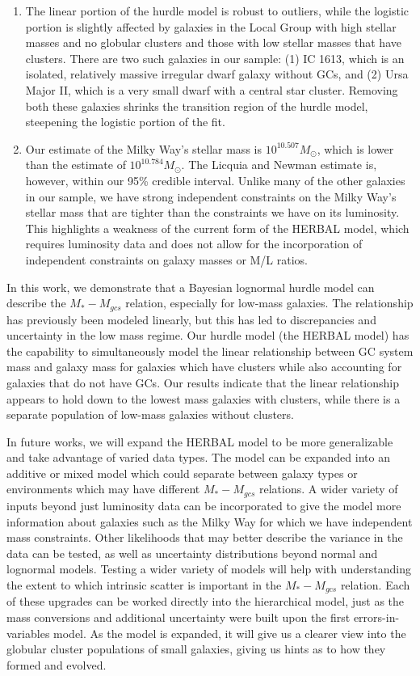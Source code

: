 \documentclass[twocolumn]{aastex631}
\begin{document}
\begin{enumerate}
    \item The linear portion of the hurdle model is robust to outliers, while the logistic portion is slightly affected by galaxies in the Local Group with high stellar masses and no globular clusters and those with low stellar masses that have clusters. There are two such galaxies in our sample: (1) IC 1613, which is an isolated, relatively massive irregular dwarf galaxy without GCs, and (2) Ursa Major II, which is a very small dwarf with a central star cluster. Removing both these galaxies shrinks the transition region of the hurdle model, steepening the logistic portion of the fit.
    \item Our estimate of the Milky Way's stellar mass is $10^{10.507}M_\odot$, which is lower than the \citet{Licquia2015b} estimate of $10^{10.784}M_\odot$. The Licquia and Newman estimate is, however, within our 95\% credible interval. Unlike many of the other galaxies in our sample, we have strong independent constraints on the Milky Way's stellar mass that are tighter than the constraints we have on its luminosity. This highlights a weakness of the current form of the HERBAL model, which requires luminosity data and does not allow for the incorporation of independent constraints on galaxy masses or M/L ratios.
\end{enumerate}

In this work, we demonstrate that a Bayesian lognormal hurdle model can describe the $M_*-M_{gcs}$ relation, especially for low-mass galaxies. The relationship has previously been modeled linearly, but this has led to discrepancies and uncertainty in the low mass regime. Our hurdle model (the HERBAL model) has the capability to simultaneously model the linear relationship between GC system mass and galaxy mass for galaxies which have clusters while also accounting for galaxies that do not have GCs. Our results indicate that the linear relationship appears to hold down to the lowest mass galaxies with clusters, while there is a separate population of low-mass galaxies without clusters. 

In future works, we will expand the HERBAL model to be more generalizable and take advantage of varied data types. The model can be expanded into an additive or mixed model which could separate between galaxy types or environments which may have different $M_*-M_{gcs}$ relations. A wider variety of inputs beyond just luminosity data can be incorporated to give the model more information about galaxies such as the Milky Way for which we have independent mass constraints. Other likelihoods that may better describe the variance in the data can be tested, as well as uncertainty distributions beyond normal and lognormal models. Testing a wider variety of models will help with understanding the extent to which intrinsic scatter is important in the $M_*-M_{gcs}$ relation. Each of these upgrades can be worked directly into the hierarchical model, just as the mass conversions and additional uncertainty were built upon the first errors-in-variables model. As the model is expanded, it will  give us a clearer view into the globular cluster populations of small galaxies, giving us hints as to how they formed and evolved. 
\end{document}
